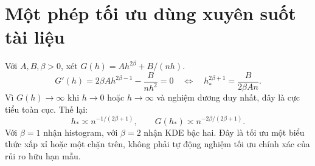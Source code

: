 \section*{Một phép tối ưu dùng xuyên suốt tài liệu}
Với $A,B,\beta>0$, xét $G(h)=Ah^{2\beta}+B/(nh)$.
\[
G'(h)=2\beta Ah^{2\beta-1}-\frac{B}{nh^2}=0
\quad\Longleftrightarrow\quad
h_*^{2\beta+1}=\frac{B}{2\beta An}.
\]
Vì $G(h)\to\infty$ khi $h\to0$ hoặc $h\to\infty$ và nghiệm dương duy
nhất, đây là cực tiểu toàn cục. Thế lại:
\[
h_*\asymp n^{-1/(2\beta+1)},\qquad
G(h_*)\asymp n^{-2\beta/(2\beta+1)}.
\]
Với $\beta=1$ nhận histogram, với $\beta=2$ nhận KDE bậc hai.
Đây là tối ưu một biểu thức xấp xỉ hoặc một chặn trên, không phải tự động
nghiệm tối ưu chính xác của rủi ro hữu hạn mẫu.
